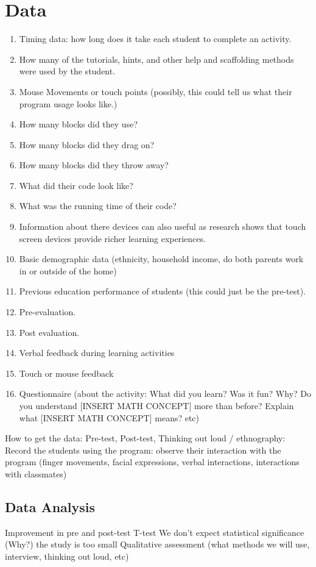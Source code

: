 \section*{Data}
\begin{enumerate}
    \item Timing data: how long does it take each student to complete an activity.
    \item How many of the tutorials, hints, and other help and scaffolding methods were used by the student. 
    \item Mouse Movements or touch points (possibly, this could tell us what their program usage looks like.)
    \item How many blocks did they use?
    \item How many blocks did they drag on? 
    \item How many blocks did they throw away?
    \item What did their code look like? 
    \item What was the running time of their code?  
    \item Information about there devices can also useful as research shows that touch screen devices provide richer learning experiences.
    \item Basic demographic data (ethnicity, household income, do both parents work in or outside of the home)
    \item Previous education performance of students (this could just be the pre-test).
    \item Pre-evaluation.
    \item Post evaluation.
    \item Verbal feedback during learning activities
    \item Touch or mouse feedback
    \item Questionnaire (about the activity: What did you learn? Was it fun? Why? Do you understand [INSERT MATH CONCEPT] more than before? Explain what [INSERT MATH CONCEPT] means? etc)
\end{enumerate}

How to get the data:
	Pre-test,
	Post-test,
	Thinking out loud / ethnography:
        Record the students using the program: observe their interaction with the program (finger movements, facial expressions, verbal interactions, interactions with classmates)
        
        
\subsection*{Data Analysis}
Improvement in pre and post-test
T-test
We don’t expect statistical significance (Why?) the study is too small 
Qualitative assessment (what methods we will use, interview, thinking out loud, etc)

